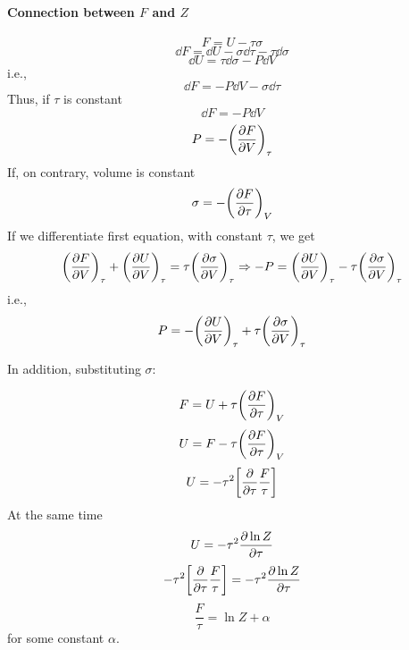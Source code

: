 \paragraph{Connection between $F$ and $Z$}
$$F = U -\tau \sigma$$
$$\dd{F} = \dd{U} -\sigma \dd{\tau} - \tau \dd{\sigma}$$
$$\dd{U} = \tau \dd{\sigma} - P\dd{V}$$
i.e.,
$$\dd{F} = -P\dd{V} - \sigma\dd{\tau}$$
Thus, if $\tau$ is constant
$$\dd{F} =- P\dd{V}$$
$$P = -\qty(\pdv{F}{V})_{\tau}$$
If, on contrary, volume is constant
$$\sigma = -\qty(\pdv{F}{\tau})_{V}$$
If we differentiate first equation, with constant $\tau$, we get
$$\qty(\pdv{F}{V})_{\tau} +\qty(\pdv{U}{V})_{\tau} = \tau\qty(\pdv{\sigma}{V})_{\tau} \Rightarrow -P = \qty(\pdv{U}{V})_{\tau} -\tau\qty(\pdv{\sigma}{V})_{\tau}$$
i.e.,
$$P = -\qty(\pdv{U}{V})_{\tau} +\tau\qty(\pdv{\sigma}{V})_{\tau}$$

In addition, substituting $\sigma$:

$$F = U  + \tau\qty(\pdv{F}{\tau})_{V} $$
$$U = F - \tau\qty(\pdv{F}{\tau})_{V}$$
$$U =- \tau^2 \qty[ \pdv{\tau} \frac{F}{\tau}]$$
At the same time
$$U = -\tau^2 \pdv{\ln Z}{\tau}$$
$$- \tau^2 \qty[ \pdv{\tau} \frac{F}{\tau}]  = -\tau^2 \pdv{\ln Z}{\tau}$$
$$ \frac{F}{\tau}  = \ln Z + \alpha$$
for some constant $\alpha$.